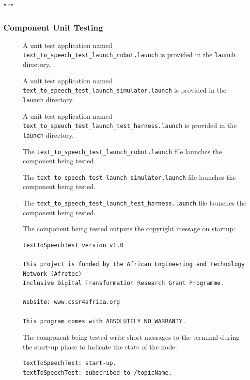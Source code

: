 \documentclass{CSSRforAfrica}
\newcommand{\checkboxChecked}{\fbox{\ding{51}}} %
\newcommand{\checkboxDashed}{\fbox{--}}         %
\begin{document}
\noindent \verb+"""+

\subsubsection{Component Unit Testing}

\begin{description}

\item[\checkboxChecked] A unit test application named {\small \verb+text_to_speech_test_launch_robot.launch+} is provided in the {\small \verb+launch+} directory. 

\item[\checkboxDashed] A unit test application named {\small \verb+text_to_speech_test_launch_simulator.launch+} is provided in the {\small \verb+launch+} directory.

\item[\checkboxChecked] A unit test application named {\small \verb+text_to_speech_test_launch_test_harness.launch+} is provided in the {\small \verb+launch+} directory.

\item[\checkboxChecked] The {\small \verb+text_to_speech_test_launch_robot.launch+} file  launches the component being tested.

\item[\checkboxDashed] The {\small \verb+text_to_speech_test_launch_simulator.launch+} file  launches the component being tested.

\item[\checkboxChecked] The {\small \verb+text_to_speech_test_launch_test_harness.launch+} file  launches the component being tested.

\item[\checkboxChecked] The component being tested outputs the copyright message on startup:  \\ 
{\scriptsize
\begin{verbatim}
textToSpeechTest version v1.0

This project is funded by the African Engineering and Technology Network (Afretec) 
Inclusive Digital Transformation Research Grant Programme. 

Website: www.cssr4africa.org

This program comes with ABSOLUTELY NO WARRANTY.
\end{verbatim}
}

\item[\checkboxChecked] The component being tested write short messages to the terminal  during the start-up phase to indicate the state of the node:
{\small
\begin{verbatim}
textToSpeechTest: start-up.
textToSpeechTest: subscribed to /topicName.
\end{verbatim}
} 


\end{description}
\end{document}
